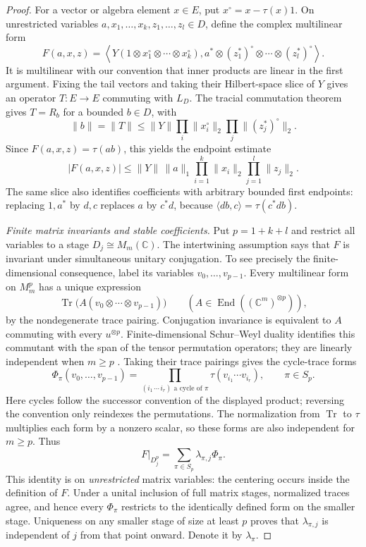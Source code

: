 \begin{proof}
For a vector or algebra element $x\in E$, put
$x^\circ=x-\tau(x)1$.  On unrestricted variables
$a,x_1,\ldots,x_k,z_1,\ldots,z_l\in D$, define the complex
multilinear form
\[
 F(a,x,z)=
 \left\langle
 Y(1\otimes x_1^\circ\otimes\cdots\otimes x_k^\circ),
 a^*\otimes(z_1^*)^\circ\otimes\cdots\otimes(z_l^*)^\circ
 \right\rangle.
\]
It is multilinear with our convention that inner products are linear
in the first argument.  Fixing the tail vectors and taking their
Hilbert-space slice of $Y$ gives an operator $T:E\to E$ commuting
with $L_D$.  The tracial commutation theorem gives $T=R_b$ for a
bounded $b\in D$, with
\[
 \|b\|=\|T\|
  \leq\|Y\|\prod_i\|x_i^\circ\|_2
                 \prod_j\|(z_j^*)^\circ\|_2.
\]
Since $F(a,x,z)=\tau(ab)$, this yields the endpoint estimate
\begin{equation}\label{eq:coefficient-bound}
 |F(a,x,z)|\leq
 \|Y\|\,\|a\|_1
       \prod_{i=1}^k\|x_i\|_2
       \prod_{j=1}^l\|z_j\|_2.
\end{equation}
The same slice also identifies coefficients with arbitrary bounded
first endpoints: replacing $1,a^*$ by $d,c$ replaces $a$ by $c^*d$,
because $\langle db,c\rangle=\tau(c^*db)$.

\smallskip\noindent
\emph{Finite matrix invariants and stable coefficients.}
Put $p=1+k+l$ and restrict all variables to a stage
$D_j\cong M_m(\mathbb C)$.  The intertwining assumption says that
$F$ is invariant under simultaneous unitary conjugation.  To see
precisely the finite-dimensional consequence, label its variables
$v_0,\ldots,v_{p-1}$.  Every multilinear form on $M_m^p$ has a unique
expression
\[
 \operatorname{Tr}\bigl(A(v_0\otimes\cdots\otimes v_{p-1})\bigr)
 \qquad
 (A\in\operatorname{End}((\mathbb C^m)^{\otimes p})),
\]
by the nondegenerate trace pairing.  Conjugation invariance is
equivalent to $A$ commuting with every $u^{\otimes p}$.
Finite-dimensional Schur--Weyl duality identifies this commutant
with the span of the tensor permutation operators; they are linearly
independent when $m\geq p$
\citep[Theorem~3.1]{GrinkoOzols2024}.
Taking their trace pairings gives the cycle-trace forms
\[
 \Phi_\pi(v_0,\ldots,v_{p-1})
   =\prod_{(i_1\,\cdots\,i_r)\text{ a cycle of }\pi}
       \tau(v_{i_1}\cdots v_{i_r}),
 \qquad \pi\in S_p.
\]
Here cycles follow the successor convention of the displayed
product; reversing the convention only reindexes the permutations.
The normalization from $\operatorname{Tr}$ to $\tau$ multiplies
each form by a nonzero scalar, so these forms are also independent
for $m\geq p$.  Thus
\[
 F\big|_{D_j^p}=\sum_{\pi\in S_p}\lambda_{\pi,j}\Phi_\pi.
\]
This identity is on \emph{unrestricted} matrix variables: the
centering occurs inside the definition of $F$.
Under a unital inclusion of full matrix stages, normalized traces
agree, and hence every $\Phi_\pi$ restricts to the identically
defined form on the smaller stage.  Uniqueness on any smaller stage
of size at least $p$ proves that $\lambda_{\pi,j}$ is independent
of $j$ from that point onward.  Denote it by $\lambda_\pi$.


\end{proof}
